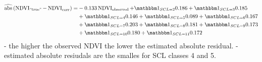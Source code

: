 \begin{equation}\label{eq:corr_lm_res}
	\begin{aligned}		
		\widehat{\operatorname{abs}}\left({\operatorname{NDVI}_\text{``true''} - \operatorname{NDVI}}_{\text{corr}}\right)  = &
		-0.133 \operatorname{NDVI}_\text{observed}  
		+ \mathbbm 1_{{SCL = 2}} 0.186 
		+ \mathbbm 1_{{SCL = 3}} 0.185 \\ &
		+ \mathbbm 1_{{SCL = 4}} 0.146 
		+ \mathbbm 1_{{SCL = 5}} 0.089 
		+ \mathbbm 1_{{SCL = 6}} 0.167 \\ &
		+ \mathbbm 1_{{SCL = 7}} 0.203 
		+ \mathbbm 1_{{SCL = 8}} 0.181  
		+ \mathbbm 1_{{SCL = 9}} 0.173 \\ &
		+ \mathbbm 1_{{SCL = 10}} 0.180 
		+ \mathbbm 1_{{SCL = 11}} 0.172 
	\end{aligned}
\end{equation}
- the higher the observed NDVI the lower the estimated absolute residual.
- estimated absolute resiudals are the smalles for SCL classes 4 and 5.  
